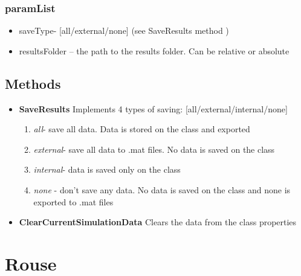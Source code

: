 \documentclass[12pt]{report}
\begin{document}
\subsubsection{paramList}
\begin{itemize}
\item{saveType}- [all/external/none] (see SaveResults method )
\item{resultsFolder} – the path to the results folder. Can be relative or absolute
\end{itemize}

\subsection{Methods}
\begin{itemize}
\item{\textbf{SaveResults}
 Implements 4 types of saving: [all/external/internal/none]
\begin{enumerate}
\item{\textit{all}}- save all data. Data is stored on the class and exported
\item{\textit{external}}- save all data to .mat files. No data is saved on the class
\item{\textit{internal}}- data is saved only on the class
\item{\textit{none}} - don't save any data. No data is saved on the class and none is exported to .mat files
\end{enumerate}}

\item{\textbf{ClearCurrentSimulationData}} Clears the data from the class properties
 \end{itemize}
 
\section{Rouse}\label{secRouse}
\end{document}
